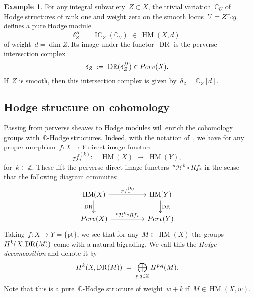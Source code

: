 \documentclass[a4paper]{amsart}
\newcommand{\bbC}{\mathbb{C}}
\newcommand{\bbZ}{\mathbb{Z}}
\newcommand{\cH}{\mathcal{H}}
\newcommand{\rH}{\textup{H}}
\newcommand{\rR}{\textup{R}}
\newcommand{\sssT}{\scriptscriptstyle{T}}
\newcommand{\tfstar}{{_{\sssT}f}_*}
\newcommand{\reg}{\textup{reg}}
\newcommand{\Perv}{\textup{Perv}}
\DeclareMathOperator{\IC}{IC}
\DeclareMathOperator{\DR}{DR}
\DeclareMathOperator{\HM}{HM}
\theoremstyle{plain}
\theoremstyle{definition}
\newtheorem{example}[theorem]{Example}
\numberwithin{equation}{section}
\begin{document}
\begin{example} 
For any integral subvariety~$Z\subset X$, the trivial variation~$\bbC_U$ of Hodge structures of rank one and weight zero on the smooth locus~$U=Z^\reg$ defines a pure Hodge module 
%
\[
 \delta_Z^H \;=\; \IC_Z(\bbC_U)
 \;\in\; \HM(X, d).
\]
%
of weight~$d=\dim Z$. Its image under the functor~$\DR$ is the perverse intersection complex 
%
\[ \delta_Z \;:=\; \DR(\delta_Z^H) \in \Perv(X). \]
%
If~$Z$ is smooth, then this intersection complex is given by~$\delta_Z = \bbC_Z[d]$.
\end{example}


\subsection{Hodge structure on cohomology} \label{sec:hodge-structure-on-cohomology}
Passing from perverse sheaves to Hodge modules will enrich the cohomology groups with~$\bbC$-Hodge structures. Indeed, with the notation of~\cite[def.~12.7.28]{MHMProject}, we have for any proper morphism~$f\colon X\to Y$ direct image functors
%
\[
 \tfstar^{(k)} \colon \quad \HM(X) \;\longrightarrow\; \HM(Y),
\]
%
for~$k\in \bbZ$. These lift the perverse direct image functors~${}^p \cH^k\circ Rf_*$ in the sense that the following diagram commutes:
\[
\begin{tikzcd}[column sep = 50pt]
\HM(X) \ar[r, "\tfstar^{(k)}"] \ar[d, swap, "\DR"]
& \HM(Y) \ar[d] \ar[d, "\DR"]
\\
\Perv(X) \ar[r, "{}^p \cH^k\circ \rR f_*"] 
& \Perv(Y)
\end{tikzcd} 
\]
%
Taking~$f\colon X\to Y=\{\mathrm{pt}\}$, we see that for any~$M\in \HM(X)$ the groups~$\rH^k(X, \DR(M))$ come with a natural bigrading. We call this the \emph{Hodge decomposition} and denote it by
%
\[
 \rH^k(X, \DR(M)) \;=\; \bigoplus_{p,q\in \bbZ} \rH^{p,q}(M).
\]
%
Note that this is a pure~$\bbC$-Hodge structure of weight~$w+k$ if~$M\in \HM(X, w)$.
\end{document}
